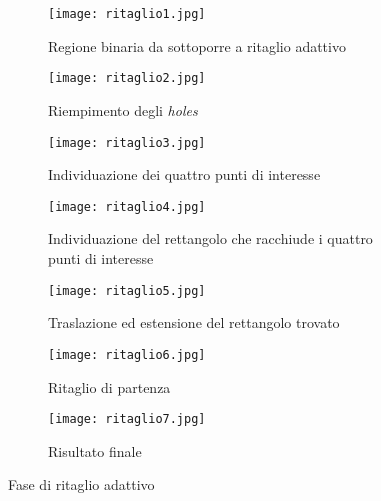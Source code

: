 \begin{figure}[h!]

  \centering
  
  \begin{subfigure}[t]{0.475\textwidth}
    \texttt{[image: ritaglio1.jpg]}
    \caption{Regione binaria da sottoporre a ritaglio adattivo}
  \end{subfigure}
  \begin{subfigure}[t]{0.475\textwidth}
    \texttt{[image: ritaglio2.jpg]}
    \caption{Riempimento degli \textit{holes}}
  \end{subfigure}
  
  \vspace{5mm}
  
  \begin{subfigure}[b]{0.7\textwidth}
    \texttt{[image: ritaglio3.jpg]}
    \caption{Individuazione dei quattro punti di interesse}
  \end{subfigure}
  
  \vspace{5mm}
  
  \begin{subfigure}[b]{0.7\textwidth}
    \texttt{[image: ritaglio4.jpg]}
    \caption{Individuazione del rettangolo che racchiude i quattro punti di interesse}
  \end{subfigure}
  
  \vspace{5mm}
  
  \begin{subfigure}[b]{0.7\textwidth}
    \texttt{[image: ritaglio5.jpg]}
    \caption{Traslazione ed estensione del rettangolo trovato}
  \end{subfigure}
  
  \vspace{5mm}
  
  \begin{subfigure}[b]{0.475\textwidth}
    \texttt{[image: ritaglio6.jpg]}
    \caption{Ritaglio di partenza}
  \end{subfigure}
  \begin{subfigure}[b]{0.475\textwidth}
    \texttt{[image: ritaglio7.jpg]}
    \caption{Risultato finale}
  \end{subfigure}
  
  \caption{Fase di ritaglio adattivo}
  \label{fig:ritaglioAdattivo}
\end{figure}

